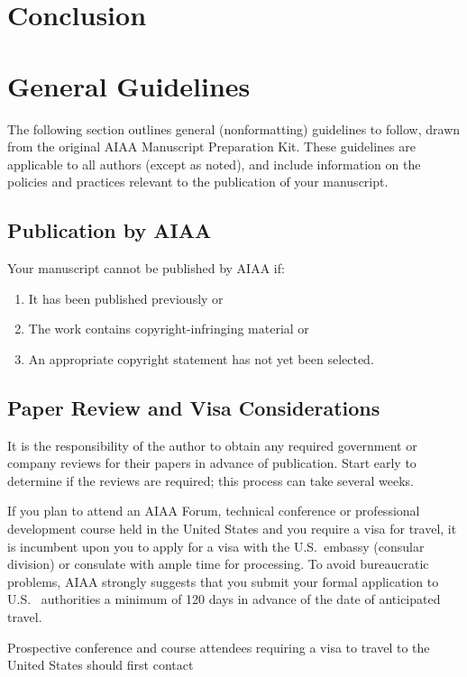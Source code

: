 \documentclass[conf]{new-aiaa}
\begin{document}
\section{Conclusion}

\section{General Guidelines}

The following section outlines general (nonformatting) guidelines to follow, drawn from the original AIAA Manuscript Preparation Kit. These guidelines are applicable to all authors (except as noted), and include information on the policies and practices relevant to the publication of your manuscript.

\subsection{Publication by AIAA}
Your manuscript cannot be published by AIAA if:
\begin{enumerate}
\item It has been published previously or

\item The work contains copyright-infringing material or

\item An appropriate copyright statement has not yet been selected.
\end{enumerate}

\subsection{Paper Review and Visa Considerations}

It is the responsibility of the author to obtain any required government or company reviews for their papers in advance of publication. Start early to determine if the reviews are required; this process can take several weeks.

If you plan to attend an AIAA Forum, technical conference or professional development course held in the United States and you require a visa for travel, it is incumbent upon you to apply for a visa with the U.S.~embassy (consular division) or consulate with ample time for processing.  To avoid bureaucratic problems, AIAA strongly suggests that you submit your formal application to U.S.~ authorities a minimum of 120 days in advance of the date of anticipated travel.

Prospective conference and course attendees requiring a visa to travel to the United States should first contact
\end{document}
